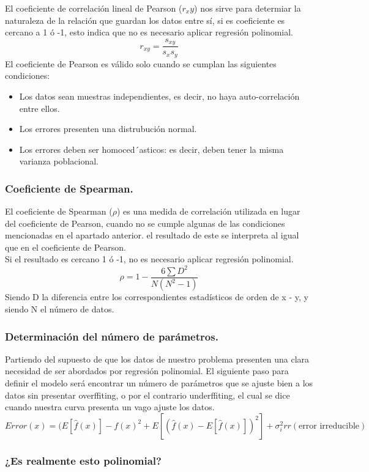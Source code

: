 \documentclass[a4paper,10pt]{article}
\begin{document}
El coeficiente de correlación lineal de Pearson ($r_xy$) nos sirve para determiar la naturaleza de la relación que guardan los datos entre sí, si es coeficiente es cercano a 1 ó -1, esto indica que no es necesario aplicar regresión polinomial.
\[
r_{xy}=\frac{s_{xy}}{s_x s_y}
\]
El coeficiente de Pearson es válido solo cuando se cumplan las siguientes condiciones:
\begin{itemize}
    \item Los datos sean muestras independientes, es decir, no haya auto-correlación entre ellos.
    \item Los errores presenten una distrubución normal.
    \item Los errores deben ser homoced´asticos: es decir, deben tener la misma
varianza poblacional.
\end{itemize}
\subsubsection{Coeficiente de Spearman.}

El coeficiente de Spearman ($\rho$) es una medida de correlación utilizada en lugar del coeficiente de Pearson, cuando no se cumple algunas de las condiciones mencionadas en el apartado anterior. el resultado de este se interpreta al igual que en el coeficiente de Pearson. \\Si el resultado es cercano 1 ó -1, no es necesario aplicar regresión polinomial.
\[
\rho = 1 - \frac{6\sum D^2}{N(N^2 - 1)}
\]
Siendo D la diferencia entre los correspondientes estadísticos de orden de x - y, y siendo N el número de datos.
\subsubsection{Determinación del número de parámetros.}

Partiendo del supuesto de que los datos de nuestro problema presenten una clara necesidad de ser abordados por regresión polinomial. El siguiente paso para definir el modelo será encontrar un número de parámetros que se ajuste bien a los datos sin presentar overffiting, o por el contrario underffiting, el cual se dice cuando nuestra curva presenta un vago ajuste los datos. 
\[
Error (x) = (E[\hat{f}(x)]-f(x)^2+E[(\hat{f}(x)-E[\hat{f}(x)])^2]+\sigma^2_irr (\text{error irreducible})
\]
\subsubsection{¿Es realmente esto polinomial?}
\end{document}
